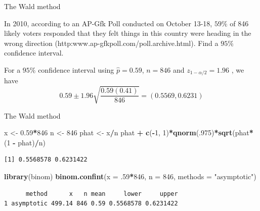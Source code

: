 \documentclass[
  ignorenonframetext,
]{beamer}
\newenvironment{Shaded}{\begin{snugshade}}{\end{snugshade}}
\newcommand{\AttributeTok}[1]{\textcolor[rgb]{0.13,0.29,0.53}{#1}}
\newcommand{\DecValTok}[1]{\textcolor[rgb]{0.00,0.00,0.81}{#1}}
\newcommand{\FloatTok}[1]{\textcolor[rgb]{0.00,0.00,0.81}{#1}}
\newcommand{\FunctionTok}[1]{\textcolor[rgb]{0.13,0.29,0.53}{\textbf{#1}}}
\newcommand{\NormalTok}[1]{#1}
\newcommand{\OtherTok}[1]{\textcolor[rgb]{0.56,0.35,0.01}{#1}}
\newcommand{\SpecialCharTok}[1]{\textcolor[rgb]{0.81,0.36,0.00}{\textbf{#1}}}
\newcommand{\StringTok}[1]{\textcolor[rgb]{0.31,0.60,0.02}{#1}}
\begin{document}
\begin{frame}{The Wald method}
\protect\hypertarget{the-wald-method-1}{}
\begin{tcolorbox}
In 2010, according to an AP-Gfk Poll conducted on October 13-18, $59\%$ of 846 likely voters responded that they felt things in this country were heading in the wrong direction (http:www.ap-gfkpoll.com/poll.archive.html). Find a $95\%$ confidence interval. 
\end{tcolorbox}

\begin{tcolorbox}
For a $95\%$ confidence interval using $\hat{p}=0.59$, $n=846$ and $z_{1-\alpha/2}=1.96$ , we have
$$0.59\pm 1.96\sqrt{\frac{0.59(0.41)}{846}}=(0.5569,0.6231)$$
\end{tcolorbox}
\end{frame}

\begin{frame}[fragile]{The Wald method}
\protect\hypertarget{the-wald-method-2}{}
\small

\begin{Shaded}
\begin{Highlighting}[]
\NormalTok{x }\OtherTok{\textless{}{-}} \FloatTok{0.59}\SpecialCharTok{*}\DecValTok{846}
\NormalTok{n }\OtherTok{\textless{}{-}} \DecValTok{846}
\NormalTok{phat }\OtherTok{\textless{}{-}}\NormalTok{ x}\SpecialCharTok{/}\NormalTok{n}
\NormalTok{phat }\SpecialCharTok{+} \FunctionTok{c}\NormalTok{(}\SpecialCharTok{{-}}\DecValTok{1}\NormalTok{, }\DecValTok{1}\NormalTok{)}\SpecialCharTok{*}\FunctionTok{qnorm}\NormalTok{(.}\DecValTok{975}\NormalTok{)}\SpecialCharTok{*}\FunctionTok{sqrt}\NormalTok{(phat}\SpecialCharTok{*}\NormalTok{(}\DecValTok{1} \SpecialCharTok{{-}}\NormalTok{ phat)}\SpecialCharTok{/}\NormalTok{n)}
\end{Highlighting}
\end{Shaded}

\begin{verbatim}
[1] 0.5568578 0.6231422
\end{verbatim}

\begin{Shaded}
\begin{Highlighting}[]
\FunctionTok{library}\NormalTok{(binom)}
\FunctionTok{binom.confint}\NormalTok{(}\AttributeTok{x =}\NormalTok{ .}\DecValTok{59}\SpecialCharTok{*}\DecValTok{846}\NormalTok{, }\AttributeTok{n =} \DecValTok{846}\NormalTok{, }\AttributeTok{methods =} \StringTok{"asymptotic"}\NormalTok{)}
\end{Highlighting}
\end{Shaded}

\begin{verbatim}
      method      x   n mean     lower     upper
1 asymptotic 499.14 846 0.59 0.5568578 0.6231422
\end{verbatim}

\normalsize
\end{frame}
\end{document}
